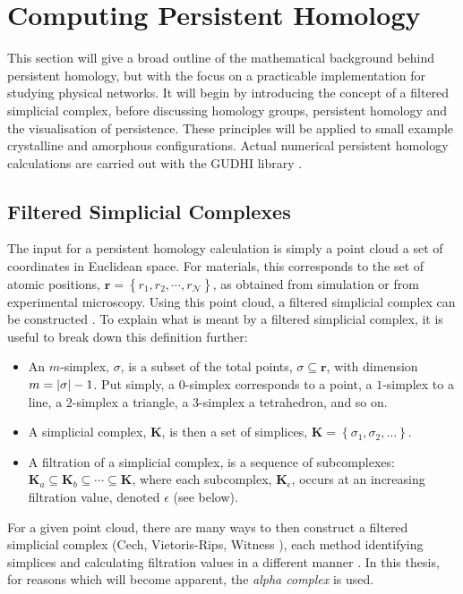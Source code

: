 \section{Computing Persistent Homology}

This section will give a broad outline of the mathematical background behind persistent homology, but with the focus on a practicable implementation for studying physical \td{} networks.
It will begin by introducing the concept of a filtered simplicial complex, before discussing homology groups, persistent homology and the visualisation of persistence.
These principles will be applied to small example crystalline and amorphous configurations.
Actual numerical persistent homology calculations are carried out with the GUDHI library \cite{gudhi}.

\subsection{Filtered Simplicial Complexes}

The input for a persistent homology calculation is simply a point cloud \ie{} a set of coordinates in Euclidean space.
For materials, this corresponds to the set of atomic positions, $\mathbf{r}=\left\{r_1,r_2,\cdots,r_\mathcal{N}\right\}$, as obtained from simulation or from experimental microscopy.
Using this point cloud, a filtered simplicial complex can be constructed \cite{Fugacci2016}.
To explain what is meant by a filtered simplicial complex, it is useful to break down this definition further:
\begin{itemize}
	\item An $m$\--simplex, $\sigma$, is a subset of the total points, $\sigma\subseteq\mathbf{r}$, with dimension $m=\lvert\sigma\rvert-1$.
Put simply, a $0$\--simplex corresponds to a point, a $1$\--simplex to a line, a $2$\--simplex a triangle, a $3$\--simplex a tetrahedron, and so on.%
	\item A simplicial complex, $\mathbf{K}$, is then a set of simplices, $\mathbf{K}=\left\{\sigma_1,\sigma_2,\dots\right\}$.
	\item A filtration of a simplicial complex, is a sequence of subcomplexes: $\mathbf{K}_a \subseteq \mathbf{K}_b \subseteq \cdots \subseteq \mathbf{K}$, where each subcomplex, $\mathbf{K}_\epsilon$, occurs at an increasing filtration value, denoted $\epsilon$ (see below).
\end{itemize}
For a given point cloud, there are many ways to then construct a filtered simplicial complex (Cech, Vietoris\--Rips, Witness \etc), each method identifying simplices and calculating filtration values in a different manner  \cite{Otter2017}.
In this thesis, for reasons which will become apparent, the \textit{alpha complex} is used.

